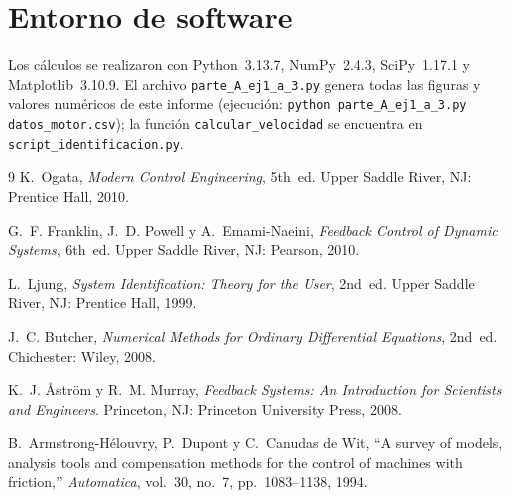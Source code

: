 \documentclass[journal,10pt,a4paper]{IEEEtran}
\begin{document}
\appendices
\section{Entorno de software}
Los cálculos se realizaron con Python~3.13.7, NumPy~2.4.3, SciPy~1.17.1 y Matplotlib~3.10.9. El archivo \texttt{parte\_A\_ej1\_a\_3.py} genera todas las figuras y valores numéricos de este informe (ejecución: \texttt{python parte\_A\_ej1\_a\_3.py datos\_motor.csv}); la función \texttt{calcular\_velocidad} se encuentra en \texttt{script\_identificacion.py}.

\begin{thebibliography}{9}
K.~Ogata, \emph{Modern Control Engineering}, 5th~ed. Upper Saddle River, NJ: Prentice Hall, 2010.

G.~F. Franklin, J.~D. Powell y A.~Emami-Naeini, \emph{Feedback Control of Dynamic Systems}, 6th~ed. Upper Saddle River, NJ: Pearson, 2010.

L.~Ljung, \emph{System Identification: Theory for the User}, 2nd~ed. Upper Saddle River, NJ: Prentice Hall, 1999.

J.~C. Butcher, \emph{Numerical Methods for Ordinary Differential Equations}, 2nd~ed. Chichester: Wiley, 2008.

K.~J. {\AA}str{\"o}m y R.~M. Murray, \emph{Feedback Systems: An Introduction for Scientists and Engineers}. Princeton, NJ: Princeton University Press, 2008.

B.~Armstrong-H{\'e}louvry, P.~Dupont y C.~Canudas de Wit, ``A survey of models, analysis tools and compensation methods for the control of machines with friction,'' \emph{Automatica}, vol.~30, no.~7, pp.~1083--1138, 1994.
\end{thebibliography}
\end{document}
